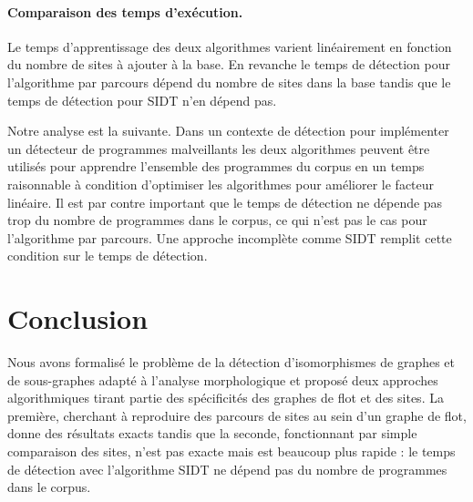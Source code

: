 
\FloatBarrier
\paragraph{Comparaison des temps d'exécution.}
Le temps d'apprentissage des deux algorithmes varient linéairement en fonction du nombre de sites à ajouter à la base.
En revanche le temps de détection pour l'algorithme par parcours dépend du nombre de sites dans la base tandis que le temps de détection pour SIDT n'en dépend pas.

Notre analyse est la suivante. Dans un contexte de détection pour implémenter un détecteur de programmes malveillants les deux algorithmes peuvent être utilisés pour apprendre l'ensemble des programmes du corpus en un temps raisonnable à condition d'optimiser les algorithmes pour améliorer le facteur linéaire.
Il est par contre important que le temps de détection ne dépende pas trop du nombre de programmes dans le corpus, ce qui n'est pas le cas pour l'algorithme par parcours. Une approche incomplète comme SIDT remplit cette condition sur le temps de détection.

\section{Conclusion}
Nous avons formalisé le problème de la détection d'isomorphismes de graphes et de sous-graphes adapté à l'analyse morphologique et proposé deux approches algorithmiques tirant partie des spécificités des graphes de flot et des sites.
La première, cherchant à reproduire des parcours de sites au sein d'un graphe de flot, donne des résultats exacts tandis que la seconde, fonctionnant par simple comparaison des sites, n'est pas exacte mais est beaucoup plus rapide : le temps de détection avec l'algorithme SIDT ne dépend pas du nombre de programmes dans le corpus.

